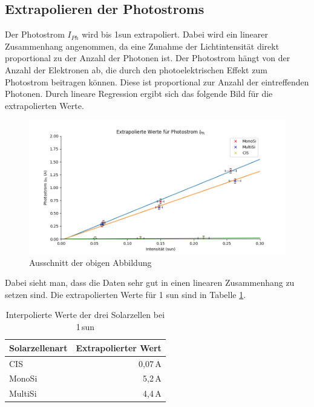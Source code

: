 \subsection{Extrapolieren der Photostroms}

Der Photostrom $I_{Ph}$ wird bis 1sun extrapoliert. Dabei wird ein linearer Zusammenhang angenommen, da eine Zunahme der Lichtintensität direkt proportional zu der 
Anzahl der Photonen ist. Der Photostrom hängt von der Anzahl der Elektronen ab, die durch den photoelektrischen Effekt zum Photostrom beitragen können. Diese ist proportional zur 
Anzahl der eintreffenden Photonen. Durch lineare Regression ergibt sich das folgende Bild für die extrapolierten Werte.
\begin{figure}[h]
    \centering
    \includegraphics[width = 12cm]{Bilder/ExtraInt.png}
    \caption{Ausschnitt der obigen Abbildung}
\end{figure} 

Dabei sieht man, dass die Daten sehr gut in einen linearen Zusammenhang zu setzen sind. Die extrapolierten Werte für 1 sun sind in Tabelle \ref{tabelle:Interpol}.
\begin{table}[ht]
    \centering
    \begin{tabular}{lr}
        Solarzellenart & Extrapolierter Wert\\
        \midrule
        CIS & 0,07\,A\\
        MonoSi&5,2\,A\\
        MultiSi&4,4\,A\\
    \end{tabular}
    \caption{Interpolierte Werte der drei Solarzellen bei 1\,sun}
    \label{tabelle:Interpol}
\end{table}
